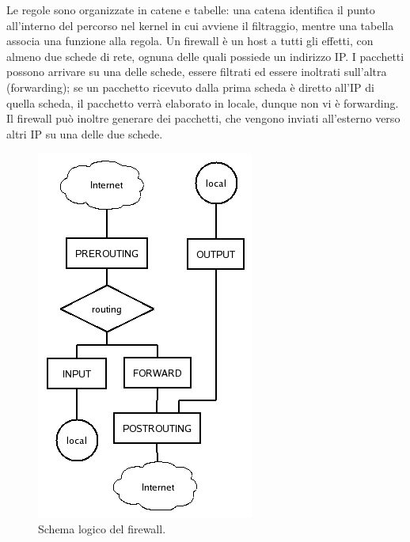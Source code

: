 Le regole sono organizzate in catene e tabelle: una catena identifica il punto all'interno del percorso nel kernel in cui avviene il filtraggio, mentre una tabella associa una funzione alla regola. Un firewall è un host a tutti gli effetti, con almeno due schede di rete, ognuna delle quali possiede un indirizzo IP. I pacchetti possono arrivare su una delle schede, essere filtrati ed essere inoltrati sull'altra (forwarding); se un pacchetto ricevuto dalla prima scheda è diretto all'IP di quella scheda, il pacchetto verrà elaborato in locale, dunque non vi è forwarding. Il firewall può inoltre generare dei pacchetti, che vengono inviati all'esterno verso altri IP su una delle due schede.
\begin{figure}[htbp]
	\centering
%		
	\includegraphics[scale = 0.4]{images/firewall-logic-scheme}
	\caption{Schema logico del firewall.}
	\label{img:schema-logico-firewall}
\end{figure}
